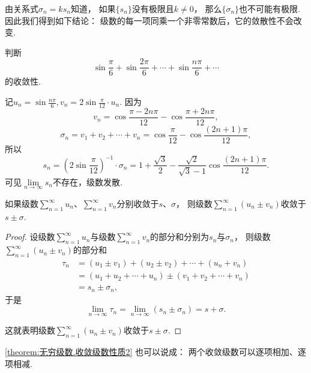 由关系式\(\sigma_n = k s_n\)知道，
如果\(\{s_n\}\)没有极限且\(k\neq0\)，
那么\(\{\sigma_n\}\)也不可能有极限.
因此我们得到如下结论：
{\color{red}级数的每一项同乘一个非零常数后，它的敛散性不会改变.}

\begin{example}
判断\[
\sin\frac{\pi}{6}+\sin\frac{2\pi}{6}+\dotsb+\sin\frac{n\pi}{6}+\dotsb
\]的收敛性.
\begin{solution}
记\(u_n = \sin\frac{n\pi}{6},
v_n = 2\sin\frac{\pi}{12} \cdot u_n\).
因为\[
	v_n = \cos\frac{\pi-2n\pi}{12} - \cos\frac{\pi+2n\pi}{12},
\]\[
	\sigma_n
	= v_1 + v_2 + \dotsb + v_n
	= \cos\frac{\pi}{12} - \cos\frac{(2n+1)\pi}{12},
\]
所以\[
	s_n
	= \left(2\sin\frac{\pi}{12}\right)^{-1} \cdot \sigma_n
	= 1+\frac{\sqrt{3}}{2} - \frac{\sqrt{2}}{\sqrt{3}-1} \cos\frac{(2n+1)\pi}{12}.
\]
可见\(\lim\limits_{n\to\infty} s_n\)不存在，级数发散.
\end{solution}
\end{example}

\begin{property}\label{theorem:无穷级数.收敛级数性质2}
如果级数\(\sum\limits_{n=1}^\infty u_n\)、\(\sum\limits_{n=1}^\infty v_n\)分别收敛于\(s\)、\(\sigma\)，
则级数\(\sum\limits_{n=1}^\infty(u_n \pm v_n)\)收敛于\(s \pm \sigma\).
\begin{proof}
设级数\(\sum\limits_{n=1}^\infty u_n\)与级数\(\sum\limits_{n=1}^\infty v_n\)的部分和分别为\(s_n\)与\(\sigma_n\)，
则级数\(\sum\limits_{n=1}^\infty(u_n \pm v_n)\)的部分和\begin{align*}
	\tau_n &= (u_1 \pm v_1) + (u_2 \pm v_2) + \dotsb + (u_n + v_n) \\
	&= (u_1 + u_2 + \dotsb + u_n) \pm (v_1 + v_2 + \dotsb + v_n) \\
	&= s_n \pm \sigma_n,
\end{align*}
于是\[
	\lim\limits_{n\to\infty} \tau_n
	= \lim\limits_{n\to\infty} (s_n \pm \sigma_n)
	= s + \sigma.
\]

这就表明级数\(\sum\limits_{n=1}^\infty(u_n \pm v_n)\)收敛于\(s \pm \sigma\).
\end{proof}
\end{property}
\cref{theorem:无穷级数.收敛级数性质2} 也可以说成：
{\color{red}两个收敛级数可以逐项相加、逐项相减.}

